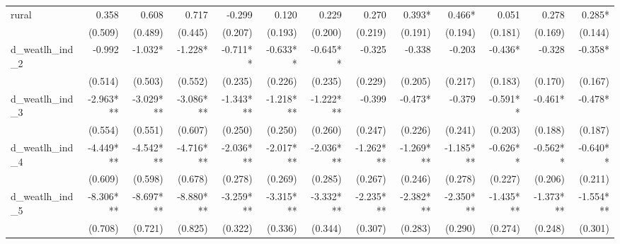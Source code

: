 \begin{tabular}{lrrrrrrrrrrrr}
rural                                       &        0.358 &        0.608 &        0.717 &       -0.299 &        0.120 &        0.229 &        0.270 &       0.393* &       0.466* &        0.051 &        0.278 &       0.285* \\ 
                                            &      (0.509) &      (0.489) &      (0.445) &      (0.207) &      (0.193) &      (0.200) &      (0.219) &      (0.191) &      (0.194) &      (0.181) &      (0.169) &      (0.144) \\ 
d\_weatlh\_ind\_2                           &       -0.992 &      -1.032* &      -1.228* &     -0.711** &     -0.633** &     -0.645** &       -0.325 &       -0.338 &       -0.203 &      -0.436* &       -0.328 &      -0.358* \\ 
                                            &      (0.514) &      (0.503) &      (0.552) &      (0.235) &      (0.226) &      (0.235) &      (0.229) &      (0.205) &      (0.217) &      (0.183) &      (0.170) &      (0.167) \\ 
d\_weatlh\_ind\_3                           &    -2.963*** &    -3.029*** &    -3.086*** &    -1.343*** &    -1.218*** &    -1.222*** &       -0.399 &      -0.473* &       -0.379 &     -0.591** &      -0.461* &      -0.478* \\ 
                                            &      (0.554) &      (0.551) &      (0.607) &      (0.250) &      (0.250) &      (0.260) &      (0.247) &      (0.226) &      (0.241) &      (0.203) &      (0.188) &      (0.187) \\ 
d\_weatlh\_ind\_4                           &    -4.449*** &    -4.542*** &    -4.716*** &    -2.036*** &    -2.017*** &    -2.036*** &    -1.262*** &    -1.269*** &    -1.185*** &     -0.626** &     -0.562** &     -0.640** \\ 
                                            &      (0.609) &      (0.598) &      (0.678) &      (0.278) &      (0.269) &      (0.285) &      (0.267) &      (0.246) &      (0.278) &      (0.227) &      (0.206) &      (0.211) \\ 
d\_weatlh\_ind\_5                           &    -8.306*** &    -8.697*** &    -8.880*** &    -3.259*** &    -3.315*** &    -3.332*** &    -2.235*** &    -2.382*** &    -2.350*** &    -1.435*** &    -1.373*** &    -1.554*** \\ 
                                            &      (0.708) &      (0.721) &      (0.825) &      (0.322) &      (0.336) &      (0.344) &      (0.307) &      (0.283) &      (0.290) &      (0.274) &      (0.248) &      (0.301) \\ 

\end{tabular}
